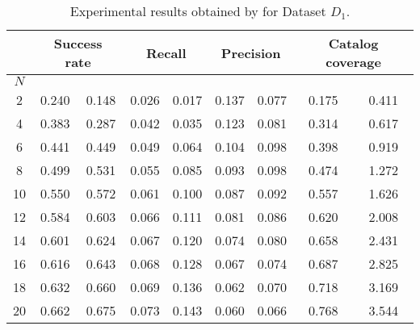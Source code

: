 \begin{table*}[t!]
	\normalsize
\caption{Experimental results obtained by \TFb for Dataset $D_{1}$.}
\begin{tabular}{|c| c|c| c|c |c|c |c|c|} \hline
	& \multicolumn{2}{c|}{\textbf{Success rate}} & \multicolumn{2}{c|}{\textbf{Recall}} & \multicolumn{2}{c|}{\textbf{Precision}} & \multicolumn{2}{c|}{ \textbf{Catalog coverage}} \\ \hline
	$N$  & \MNB     & \TF  & \MNB      & \TF   & \MNB       & \TF    & \MNB       & \TF      \\ \hline         
	
2        & 0.240    & 0.148  & 0.026    & 0.017   & 0.137    & 0.077     & 0.175   & 0.411   \\ \hline
4        & 0.383    & 0.287  & 0.042    & 0.035   & 0.123    & 0.081     & 0.314   & 0.617   \\ \hline
6        & 0.441    & 0.449  & 0.049    & 0.064   & 0.104    & 0.098     & 0.398   & 0.919   \\ \hline
\rowcolor{Gray}
8        & 0.499    & 0.531   & 0.055    & 0.085   & 0.093    & 0.098   & 0.474   & 1.272   \\ \hline
10       & 0.550    & 0.572   & 0.061    & 0.100   & 0.087    & 0.092   & 0.557   & 1.626   \\ \hline
12       & 0.584    & 0.603   & 0.066    & 0.111   & 0.081    & 0.086   & 0.620   & 2.008   \\ \hline
14       & 0.601    & 0.624   & 0.067    & 0.120   & 0.074    & 0.080   & 0.658   & 2.431   \\ \hline
16       & 0.616    & 0.643   & 0.068    & 0.128   & 0.067    & 0.074   & 0.687   & 2.825   \\ \hline
18       & 0.632    & 0.660   & 0.069    & 0.136   & 0.062    & 0.070   & 0.718   & 3.169   \\ \hline
20       & 0.662    & 0.675   & 0.073    & 0.143   & 0.060    & 0.066   & 0.768   & 3.544   \\ \hline
\end{tabular}
\label{tab:combined_dt1}
\end{table*}


